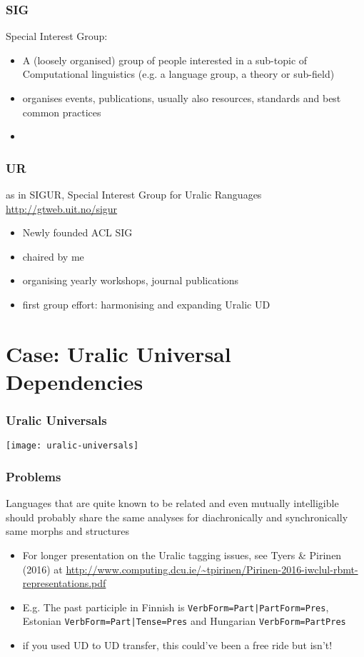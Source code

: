 \documentclass[t]{beamer}
\begin{document}
\begin{frame}
    \frametitle{SIG}
    Special Interest Group:
    \begin{itemize}
        \item A (loosely organised) group of people interested in a
            sub-topic of Computational linguistics (e.g. a language
            group, a theory or sub-field)
        \item organises events, publications, usually also resources,
            standards and best common practices
        \item 
    \end{itemize}
\end{frame}

\begin{frame}
    \frametitle{UR}
    as in SIGUR, Special Interest Group for Uralic Ranguages
    \url{http://gtweb.uit.no/sigur}
    \begin{itemize}
        \item Newly founded ACL SIG
        \item chaired by me
        \item organising yearly workshops, journal publications
        \item first group effort: harmonising and expanding Uralic UD
    \end{itemize}
\end{frame}


\section{Case: Uralic Universal Dependencies}

\begin{frame}
    \frametitle{Uralic Universals}
    \texttt{[image: uralic-universals]}
\end{frame}

\begin{frame}
    \frametitle{Problems}
    Languages that are quite known to be related and even mutually intelligible
    should probably share the same analyses for diachronically and synchronically
    same morphs and structures
    \begin{itemize}
        \item For longer presentation on the Uralic tagging issues,
            see Tyers \& Pirinen (2016) at
            \url{http://www.computing.dcu.ie/~tpirinen/Pirinen-2016-iwclul-rbmt-representations.pdf}
        \item E.g. The past participle in Finnish is 
            \texttt{VerbForm=Part|PartForm=Pres}, Estonian 
            \texttt{VerbForm=Part|Tense=Pres} and Hungarian \texttt{VerbForm=PartPres}
        \item if you used UD to UD transfer, this could've been a free ride but
            isn't!
    \end{itemize}
\end{frame}
\end{document}
